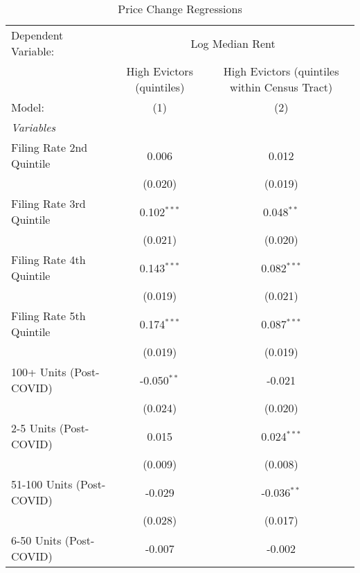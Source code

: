 \begin{table}[htbp]
   \caption{Price Change Regressions}
   \centering
   \begin{tabular}{lcc}
      \tabularnewline \midrule \midrule
      Dependent Variable: & \multicolumn{2}{c}{Log Median Rent}\\
                                                  & High Evictors (quintiles) & High Evictors (quintiles within Census Tract) \\   
      Model:                                      & (1)                       & (2)\\  
      \midrule
      \emph{Variables}\\
      Filing Rate 2nd Quintile                    & 0.006                     & 0.012\\   
                                                  & (0.020)                   & (0.019)\\   
      Filing Rate 3rd Quintile                    & 0.102$^{***}$             & 0.048$^{**}$\\   
                                                  & (0.021)                   & (0.020)\\   
      Filing Rate 4th Quintile                    & 0.143$^{***}$             & 0.082$^{***}$\\   
                                                  & (0.019)                   & (0.021)\\   
      Filing Rate 5th Quintile                    & 0.174$^{***}$             & 0.087$^{***}$\\   
                                                  & (0.019)                   & (0.019)\\   
      100+ Units (Post-COVID)                     & -0.050$^{**}$             & -0.021\\   
                                                  & (0.024)                   & (0.020)\\   
      2-5 Units (Post-COVID)                      & 0.015                     & 0.024$^{***}$\\   
                                                  & (0.009)                   & (0.008)\\   
      51-100 Units (Post-COVID)                   & -0.029                    & -0.036$^{**}$\\   
                                                  & (0.028)                   & (0.017)\\   
      6-50 Units (Post-COVID)                     & -0.007                    & -0.002\\   

\end{tabular}
\end{table}
